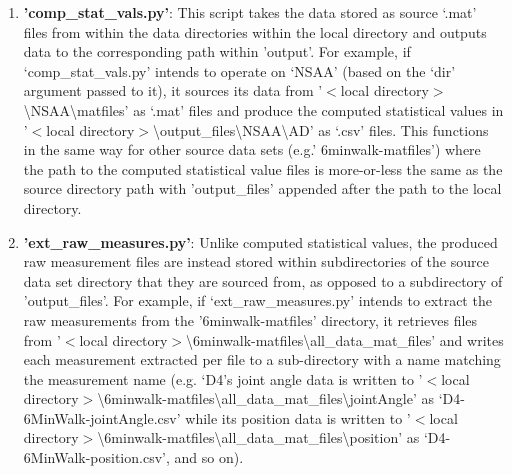 \documentclass[12pt,twoside]{report}
\begin{document}
\begin{enumerate}
	\item \textbf{'comp\_stat\_vals.py'}: This script takes the data stored as source ‘.mat’ files from within the data directories within the local directory and outputs data to the corresponding path within 'output'. For example, if ‘comp\_stat\_vals.py’ intends to operate on ‘NSAA’ (based on the ‘dir’ argument passed to it), it sources its data from '$<$local directory$>$\textbackslash NSAA\textbackslash matfiles' as ‘.mat’ files and produce the computed statistical values in '$<$local directory$>$\textbackslash output\_files\textbackslash NSAA\textbackslash AD' as ‘.csv’ files. This functions in the same way for other source data sets (e.g.' 6minwalk-matfiles') where the path to the computed statistical value files is more-or-less the same as the source directory path with 'output\_files' appended after the path to the local directory.
	\item \textbf{'ext\_raw\_measures.py'}: Unlike computed statistical values, the produced raw measurement files are instead stored within subdirectories of the source data set directory that they are sourced from, as opposed to a subdirectory of 'output\_files'. For example, if ‘ext\_raw\_measures.py’ intends to extract the raw measurements from the '6minwalk-matfiles' directory, it retrieves files from '$<$local directory$>$\textbackslash 6minwalk-matfiles\textbackslash all\_data\_mat\_files' and writes each measurement extracted per file to a sub-directory with a name matching the measurement name (e.g. ‘D4’s joint angle data is written to '$<$local directory$>$\textbackslash 6minwalk-matfiles\textbackslash all\_data\_mat\_files\textbackslash jointAngle' as ‘D4-6MinWalk-jointAngle.csv’ while its position data is written to '$<$local directory$>$\textbackslash 6minwalk-matfiles\textbackslash all\_data\_mat\_files\textbackslash position' as ‘D4-6MinWalk-position.csv’, and so on).

\end{enumerate}
\end{document}
